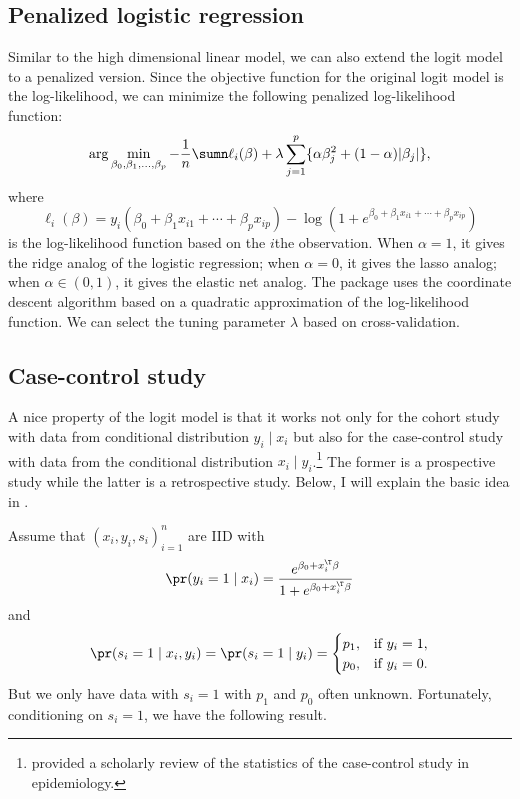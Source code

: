 \subsection{Penalized logistic regression}


Similar to the high dimensional linear model, we can also extend the logit model to a penalized version. Since the objective function for the original logit model is the log-likelihood, we can minimize the following penalized log-likelihood function: 
\[
\arg\min_{\beta_0,\beta_1, \ldots, \beta_p}-\frac{1}{n}\sumn \ell_i(\beta )   +\lambda\sum_{j=1}^{p} \{  \alpha \beta_j^2 + (1-\alpha)  |\beta_{j}| \} ,
\]
where 
$$
\ell_i(\beta) = y_{i}(\beta_{0}+\beta_{1}x_{i1}+\cdots+\beta_{p}x_{ip})-\log(1+e^{\beta_{0}+\beta_{1}x_{i1}+\cdots+\beta_{p}x_{ip}})
$$ 
is the log-likelihood function based on the $i$the observation. When $\alpha = 1$, it gives the ridge analog of the logistic regression; when $\alpha = 0$, it gives the lasso analog; when $\alpha \in (0,1)$, it gives the elastic net analog. 
The  package  uses the coordinate descent algorithm based on a quadratic
approximation of the log-likelihood function. We can select the tuning parameter $\lambda$ based on cross-validation. 

\subsection{Case-control study}\label{sec::case-control-study}


A nice property of the logit model is that it works not only for  the cohort study with data from conditional distribution $y_i\mid x_i$ but also for the case-control study with data from the conditional distribution $x_i\mid y_i$.\footnote{
\citet{breslow1996statistics} provided a scholarly review of the statistics of the case-control study in epidemiology.
} The former is a prospective study while the latter is a retrospective study. Below, I will explain the basic idea in \citet{prentice1979logistic}. 


Assume that $(x_{i},y_{i},s_{i})_{i=1}^n $ are IID with 
\begin{eqnarray}
\label{eq::cc=1}
\pr(y_i = 1\mid x_i) =  \frac{e^{\beta_{0}+x_{i}^{\T}\beta}}{1+e^{\beta_{0}+x_{i}^{\T}\beta}} 
\end{eqnarray}
and
\begin{eqnarray}
\label{eq::cc=2}
\pr(s_{i}=1\mid x_{i},y_{i})=\pr(s_{i}=1\mid y_{i})=\begin{cases}
p_{1}, & \text{if }y_{i}=1,\\
p_{0}, & \text{if }y_{i}=0.
\end{cases}
\end{eqnarray}
But we only have data with $s_{i}=1$ with $p_{1}$ and $p_{0}$ often
unknown. Fortunately, conditioning on $s_{i}=1$, we have the following result. 

